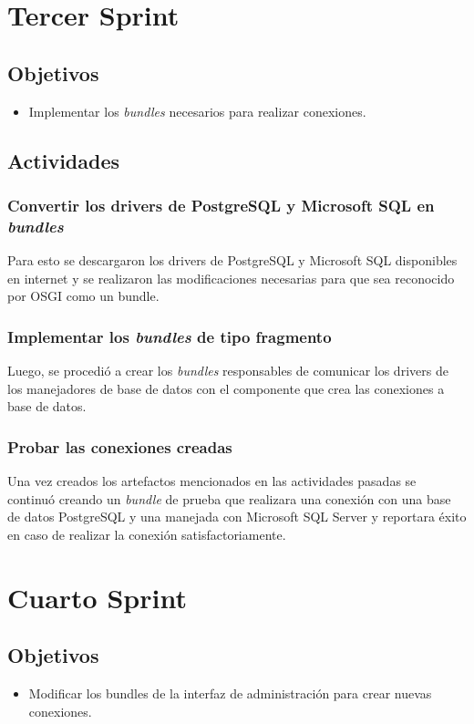 \section{Tercer Sprint}

\subsection{Objetivos}
\begin{itemize}
  \item Implementar los \emph{bundles} necesarios para realizar conexiones.
\end{itemize}
\subsection{Actividades}
\subsubsection{Convertir los drivers de PostgreSQL y Microsoft SQL en \emph{bundles}}
Para esto se descargaron los drivers de PostgreSQL y Microsoft SQL disponibles en
internet y se realizaron las modificaciones necesarias para que sea reconocido por
OSGI como un bundle.
\subsubsection{Implementar los \emph{bundles} de tipo fragmento}
Luego, se procedió a crear los \emph{bundles} responsables de comunicar los
drivers de los manejadores de base de datos con el componente que crea las conexiones
a base de datos.
\subsubsection{Probar las conexiones creadas}
Una vez creados los artefactos mencionados en las actividades pasadas se continuó
creando un \emph{bundle} de prueba que realizara una conexión con una base de datos
PostgreSQL y una manejada con Microsoft SQL Server y reportara éxito en caso de
realizar la conexión satisfactoriamente.

\section{Cuarto Sprint}

\subsection{Objetivos}
\begin{itemize}
  \item Modificar los bundles de la interfaz de administración para crear nuevas
  conexiones.
\end{itemize}
